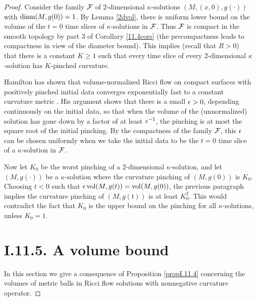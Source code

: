 \begin{proof}
Consider the family ${\mathcal F}$
of 2-dimensional $\kappa$-solutions $(M,(x,0),g(\cdot))$
with $\operatorname{diam}(M,g(0))=1$.  By Lemma \ref{2dvol}, there is uniform
lower bound on the volume of the $t=0$ time slices of $\kappa$-solutions in
${\mathcal F}$. Thus ${\mathcal F}$  is compact in the smooth topology by part 3 of
Corollary \ref{11.4cors}
(the precompactness leads to compactness in view of the diameter bound).
This implies
(recall that $R > 0$) that there is a constant $K\geq 1$ such that
every time slice of every 2-dimensional $\kappa$-solution has
$K$-pinched curvature.

Hamilton has shown that volume-normalized Ricci
flow on compact surfaces with positively pinched initial data
converges exponentially fast to a constant curvature metric
\cite{Hamsurface}.
His argument shows that there is a small $\epsilon>0$, depending
continuously on the initial data, so that when the volume of the
(unnormalized) solution
has  gone down by a factor of
at least $\epsilon^{-1}$,
the pinching is at most the square
root of the initial pinching.  By the compactness of the family ${\mathcal F}$,
this $\epsilon$ can be chosen
uniformly when we take the initial data to be the $t=0$ time slice
of a  $\kappa$-solution in ${\mathcal F}$.

Now let $K_0$ be the worst pinching of
a 2-dimensional $\kappa$-solution, and let
 $(M,g(\cdot))$ be a $\kappa$-solution where the curvature pinching of
$(M,g(0))$ is $K_0$.  Choosing $t<0$ such that
$\epsilon\operatorname{vol}(M,g(t))=\operatorname{vol}(M,g(0))$,
the previous paragraph implies the curvature pinching of $(M,g(t))$ is at
least $K_0^2$. This would
 contradict the fact that $K_0$ is the upper bound on the
pinching for all $\kappa$-solutions, unless $K_0=1$.



\section{I.11.5. A volume bound}

In this section we give a consequence of Proposition \ref{propI.11.4}
concerning the volumes of metric balls in Ricci flow solutions
with nonnegative curvature operator.


\end{proof}
